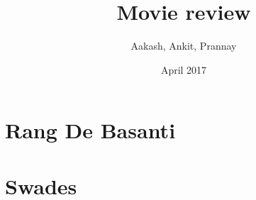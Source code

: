 \documentclass{article}
\title{Movie review}
\author{Aakash, Ankit, Prannay }
\date{April 2017}
\begin{document}
\maketitle

\section*{Rang De Basanti}


\section*{ Swades }
\end{document}
